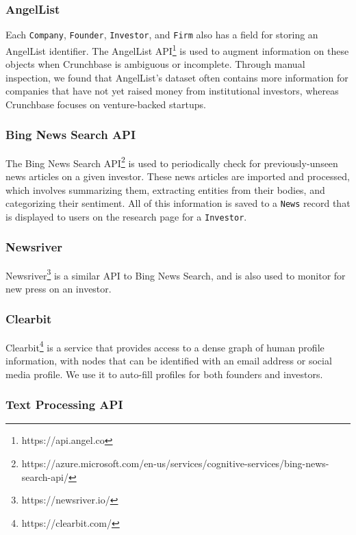 \subsubsection{AngelList}

Each \texttt{Company}, \texttt{Founder}, \texttt{Investor}, and \texttt{Firm} also has a field for storing an AngelList identifier. The AngelList API\footnote{https://api.angel.co} is used to augment information on these objects when Crunchbase is ambiguous or incomplete. Through manual inspection, we found that AngelList's dataset often contains more information for companies that have not yet raised money from institutional investors, whereas Crunchbase focuses on venture-backed startups.

\subsubsection{Bing News Search API}

The Bing News Search API\footnote{https://azure.microsoft.com/en-us/services/cognitive-services/bing-news-search-api/} is used to periodically check for previously-unseen news articles on a given investor. These news articles are imported and processed, which involves summarizing them, extracting entities from their bodies, and categorizing their sentiment. All of this information is saved to a \texttt{News} record that is displayed to users on the research page for a \texttt{Investor}.

\subsubsection{Newsriver}

Newsriver\footnote{https://newsriver.io/} is a similar API to Bing News Search, and is also used to monitor for new press on an investor.

\subsubsection{Clearbit}

Clearbit\footnote{https://clearbit.com/} is a service that provides access to a dense graph of human profile information, with nodes that can be identified with an email address or social media profile. We use it to auto-fill profiles for both founders and investors.

\subsubsection{Text Processing API}

